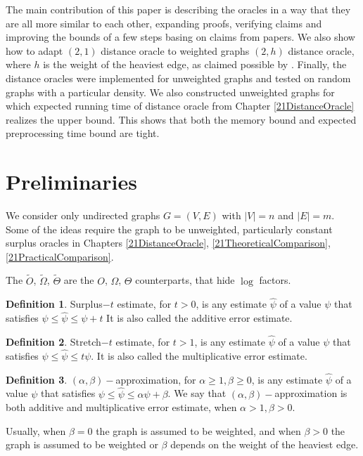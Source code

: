 \documentclass[shortabstract, lic, english]{iithesis}
\theoremstyle{definition} \newtheorem{definition}{Definition}[chapter]
\theoremstyle{plain} \newtheorem{remark}[definition]{Observation}
\theoremstyle{plain} \newtheorem{theorem}[definition]{Theorem}
\theoremstyle{plain} \newtheorem{lemma}[definition]{Lemma}
\theoremstyle{plain} \newtheorem{conjecture}[definition]{Conjecture}
\begin{document}
The main contribution of this paper is describing the oracles \cite{a0OraclesBasic, 21OracleBasic, 21OracleLessMemory} in a way that they are all more similar to each other,
expanding proofs, verifying claims and improving the bounds of a few steps basing on claims from papers.
We also show how to adapt $(2,1)$ distance oracle to weighted graphs $(2, h)$ distance oracle, where $h$ is the weight of the heaviest edge, as claimed possible by \cite{21OracleSpannerNoPenalty}.
Finally, the distance oracles were implemented for unweighted graphs and tested on random graphs with a particular density. We also constructed unweighted graphs
for which expected running time of distance oracle from Chapter \ref{21DistanceOracle} realizes the upper bound. This shows that both the memory bound and expected preprocessing time bound are tight.

\section{Preliminaries}
We consider only undirected graphs $G = (V, E)$ with $|V| = n$ and $|E| = m$. Some of the ideas require the graph to be unweighted,
particularly constant surplus oracles in Chapters \ref{21DistanceOracle}, \ref{21TheoreticalComparison}, \ref{21PracticalComparison}.

The $\tilde{O}$, $\tilde{\Omega}$, $\tilde{\Theta}$ are the $O$, $\Omega$, $\Theta$ counterparts, that hide $\log$ factors.

\begin{definition}
    Surplus$-t$ estimate, for $t>0$, is any estimate $\hat{\psi}$ of a value $\psi$ that satisfies $\psi \leq \hat{\psi} \leq \psi + t$
    It is also called the additive error estimate.
\end{definition}

\begin{definition}
    Stretch$-t$ estimate, for $t>1$, is any estimate $\hat{\psi}$ of a value $\psi$ that satisfies $\psi \leq \hat{\psi} \leq t\psi$.
    It is also called the multiplicative error estimate.
\end{definition}

\begin{definition}
    $(\alpha, \beta)-$approximation, for $\alpha \geq 1, \beta \geq 0$, is any estimate $\hat{\psi}$ of a value $\psi$ that satisfies $\psi \leq \hat{\psi} \leq \alpha\psi + \beta$.
    We say that $(\alpha, \beta)-$approximation is both additive and multiplicative error estimate, when $\alpha > 1, \beta > 0$.
\end{definition}
    Usually, when $\beta = 0$ the graph is assumed to be weighted, and when $\beta > 0$ the graph is assumed to be weighted or $\beta$ depends on the weight of the heaviest edge.
\end{document}
